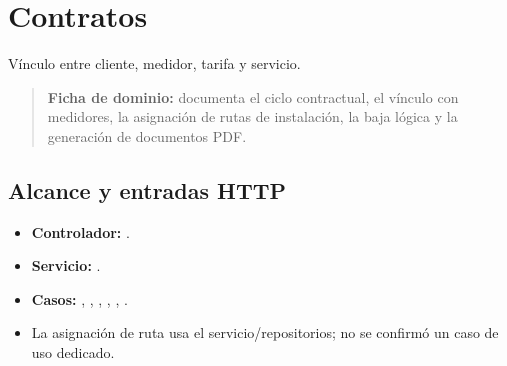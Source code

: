 \section{Contratos}


Vínculo entre cliente, medidor, tarifa y servicio.


\begin{quote}
\textbf{Ficha de dominio:} documenta el ciclo contractual, el vínculo con medidores, la asignación de rutas de instalación, la baja lógica y la generación de documentos PDF.
\end{quote}


\subsection{Alcance y entradas HTTP}


\begin{itemize}
\item \textbf{Controlador:} \texttt{}.
\item \textbf{Servicio:} \texttt{}.
\item \textbf{Casos:} \texttt{}, \texttt{}, \texttt{}, \texttt{}, \texttt{}, \texttt{}.
\item La asignación de ruta usa el servicio/repositorios; no se confirmó un caso de uso dedicado.
\end{itemize}


